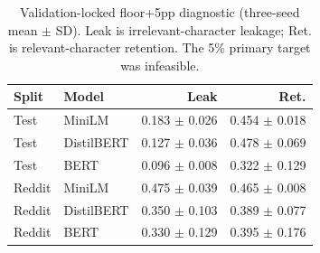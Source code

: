 \begin{table}[t]
\centering
\caption{Validation-locked floor+5pp diagnostic (three-seed mean $\pm$ SD). Leak is irrelevant-character leakage; Ret. is relevant-character retention. The 5\% primary target was infeasible.}
\label{tab:privacy}
\begin{tabular}{llrr}
\toprule
Split & Model & Leak & Ret. \\
\midrule
Test & MiniLM & 0.183 $\pm$ 0.026 & 0.454 $\pm$ 0.018 \\
Test & DistilBERT & 0.127 $\pm$ 0.036 & 0.478 $\pm$ 0.069 \\
Test & BERT & 0.096 $\pm$ 0.008 & 0.322 $\pm$ 0.129 \\
\midrule
Reddit & MiniLM & 0.475 $\pm$ 0.039 & 0.465 $\pm$ 0.008 \\
Reddit & DistilBERT & 0.350 $\pm$ 0.103 & 0.389 $\pm$ 0.077 \\
Reddit & BERT & 0.330 $\pm$ 0.129 & 0.395 $\pm$ 0.176 \\
\bottomrule
\end{tabular}
\end{table}
